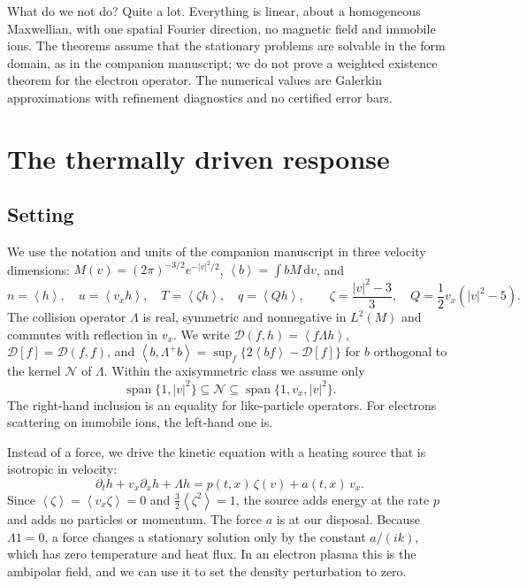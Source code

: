 \documentclass[11pt]{article}
\newcommand{\dd}{\,\mathrm d}
\newcommand{\av}[1]{\left\langle #1\right\rangle}
\newcommand{\D}{\mathcal D}
\newcommand{\N}{\mathcal N}
\newcommand{\dual}[1]{\left\langle #1,\Lambda^+ #1\right\rangle}
\theoremstyle{definition}
\theoremstyle{remark}
\numberwithin{equation}{section}
\begin{document}
What do we not do? Quite a lot. Everything is linear, about a
homogeneous Maxwellian, with one spatial Fourier direction, no magnetic
field and immobile ions. The theorems assume that the stationary problems
are solvable in the form domain, as in the companion manuscript; we do
not prove a weighted existence theorem for the electron operator. The
numerical values are Galerkin approximations with refinement diagnostics
and no certified error bars.

\section{The thermally driven response}\label{sec:thermal}

\subsection{Setting}

We use the notation and units of the companion manuscript in three
velocity dimensions: $M(v)=(2\pi)^{-3/2}e^{-|v|^2/2}$,
$\av b=\int bM\dd v$, and
\[
 n=\av h,\quad u=\av{v_xh},\quad T=\av{\zeta h},\quad q=\av{Qh},\qquad
 \zeta=\frac{|v|^2-3}{3},\quad Q=\frac12v_x(|v|^2-5).
\]
The collision operator $\Lambda$ is real, symmetric and nonnegative in
$L^2(M)$ and commutes with reflection in $v_x$. We write
$\D(f,h)=\av{f\Lambda h}$, $\D[f]=\D(f,f)$, and
$\dual b=\sup_f\{2\av{bf}-\D[f]\}$ for $b$ orthogonal to the kernel $\N$
of $\Lambda$. Within the axisymmetric class we assume only
\begin{equation}
 \operatorname{span}\{1,|v|^2\}\subseteq\N\subseteq
 \operatorname{span}\{1,v_x,|v|^2\}.
 \label{eq:kernel}
\end{equation}
The right-hand inclusion is an equality for like-particle operators. For
electrons scattering on immobile ions, the left-hand one is.

Instead of a force, we drive the kinetic equation with a heating source
that is isotropic in velocity:
\begin{equation}
 \partial_th+v_x\partial_xh+\Lambda h=p(t,x)\,\zeta(v)+a(t,x)\,v_x .
 \label{eq:kinetic}
\end{equation}
Since $\av\zeta=\av{v_x\zeta}=0$ and $\tfrac32\av{\zeta^2}=1$, the source
adds energy at the rate $p$ and adds no particles or momentum. The force
$a$ is at our disposal. Because $\Lambda1=0$, a force changes a stationary
solution only by the constant $a/(ik)$, which has zero temperature and
heat flux. In an electron plasma this is the ambipolar field, and we can
use it to set the density perturbation to zero.
\end{document}
